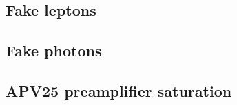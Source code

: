 \subsection{Fake leptons}

\subsection{Fake photons}






\begin{subappendices}
  \section{APV25 preamplifier saturation}
  
\end{subappendices}
